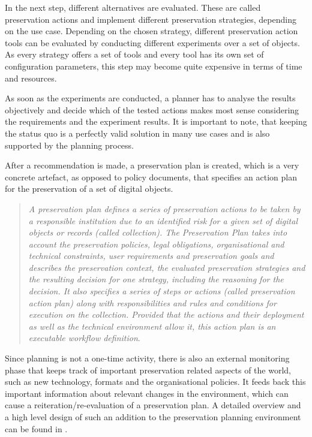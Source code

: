 In the next step, different alternatives are evaluated. These are called preservation actions and implement different preservation strategies, depending on the use case. Depending on the chosen
strategy, different preservation action tools can be evaluated by conducting different experiments over a set of objects. As every strategy offers a set of tools and every tool has its own set of configuration parameters, this step may become quite expensive in terms of time and resources.

As soon as the experiments are conducted, a planner has to analyse the results objectively and decide which of the tested actions makes most sense considering the requirements and the experiment results. It is important to note, that
keeping the status quo is a perfectly valid solution in many use cases and is also supported by the planning process.

After a recommendation is made, a preservation plan is created, which is a very concrete artefact, as opposed to policy documents, that specifies an action plan for the preservation of a set of digital objects.

\begin{quote}
\textit{A preservation plan defines a series of preservation actions to be taken by a responsible institution due to an identified risk for a given set of digital objects or records (called collection). The Preservation Plan takes into account the preservation policies, legal obligations, organisational and technical constraints, user requirements and preservation goals and describes the preservation context, the evaluated preservation strategies and the resulting decision for one strategy, including the reasoning for the decision. It also specifies a series of steps or actions (called preservation action plan) along with responsibilities and rules and conditions for execution on the collection. Provided that the actions and their deployment as well as the technical environment allow it, this action plan is an executable workflow definition}\cite{Becker:2009fk}.
\end{quote}

Since planning is not a one-time activity, there is also an external monitoring phase that keeps track of important preservation related aspects of the world, such as new technology, formats and the organisational policies. It feeds back this important information about relevant changes in the environment, which can cause a reiteration/re-evaluation of a preservation plan. A detailed overview and a high level design of such an addition to the preservation planning environment can be found in \cite{duretec:2012:watch}.


